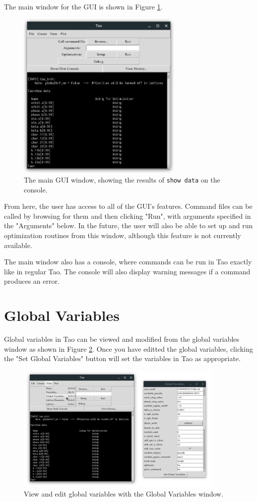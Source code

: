 The main window for the GUI is shown in Figure \ref{fig:root.window}.
\begin{figure}
\centering
\includegraphics[width=8cm]{figures/root_window.png}
\caption{The main GUI window, showing the results of \texttt{show data} on the console.}
\label{fig:root.window}
\end{figure}
From here, the user has access to all of the GUI's features.
Command files can be called by browsing for them and then clicking "Run", with arguments specified in the "Arguments" below.
In the future, the user will also be able to set up and run optimization routines from this window, although this feature is not currently available.

The main window also has a console, where commands can be run in Tao exactly like in regular Tao.
The console will also display warning messages if a command produces an error.


\section{Global Variables}
\label{s:gui.global.variables}

Global variables in Tao can be viewed and modified from the global variables window as shown in Figure \ref{fig:gui.global.variables}.
Once you have editted the global variables, clicking the "Set Global Variables" button will set the variables in Tao as appropriate.

\begin{figure}
\centering
\includegraphics[width=10cm]{figures/globals.png}
\caption{View and edit global variables with the Global Variables window.}
\label{fig:gui.global.variables}
\end{figure}

